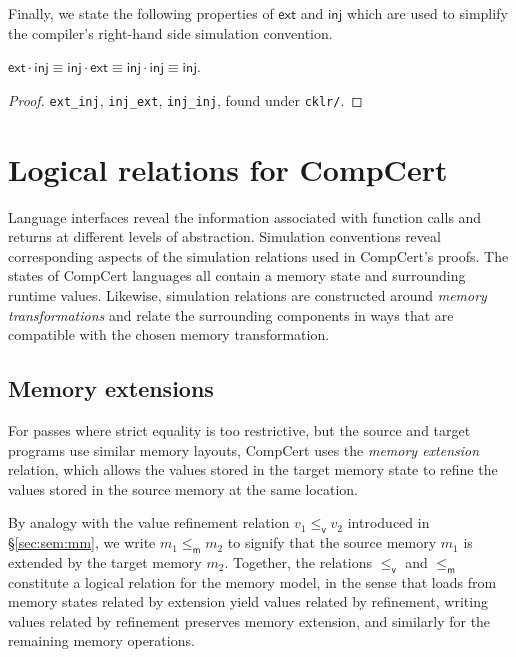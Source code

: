 \documentclass[acmsmall,authordraft]{acmart}
\newcommand{\kw}[1]{\ensuremath{ \mathsf{#1} }}
\newcommand{\vref}{\le_\kw{v}}
\newcommand{\mext}{\le_\kw{m}}
\begin{document}
Finally,
we state the following properties of $\kw{ext}$ and $\kw{inj}$
which are used to simplify
the compiler's right-hand side simulation convention.

\begin{theorem} \label{thm:extinj}
$
  \kw{ext} \cdot \kw{inj} \equiv
  \kw{inj} \cdot \kw{ext} \equiv
  \kw{inj} \cdot \kw{inj} \equiv
  \kw{inj}
$.
\begin{proof}
\texttt{ext\_inj}, \texttt{inj\_ext}, \texttt{inj\_inj},
found under \texttt{cklr/}.
\end{proof}
\end{theorem}


\section{Logical relations for CompCert} \label{sec:cklr} %

Language interfaces reveal the information
associated with function calls and returns
at different levels of abstraction.
Simulation conventions
reveal corresponding aspects of the simulation relations
used in CompCert's proofs.
%
The states of CompCert languages all contain
a memory state and surrounding runtime values.
Likewise, simulation relations
are constructed around \emph{memory transformations}
and relate the surrounding components in ways that %
are compatible with the chosen memory transformation.

\subsection{Memory extensions} \label{sec:memext} %

For passes where strict equality is too restrictive,
but the source and target programs
use similar memory layouts,
CompCert uses the \emph{memory extension} relation,
which allows the values
stored in the target memory state to refine
the values stored in the source memory at the same location.

By analogy with
the value refinement relation $v_1 \vref v_2$
introduced in \S\ref{sec:sem:mm},
we write $m_1 \mext m_2$ to signify that
the source memory $m_1$ is extended by
the target memory $m_2$.
Together,
the relations $\vref$ and $\mext$
constitute a logical relation for the memory model,
in the sense that
loads from memory states related by extension
yield values related by refinement,
writing values related by refinement
preserves memory extension,
and similarly for the remaining memory operations.
\end{document}
